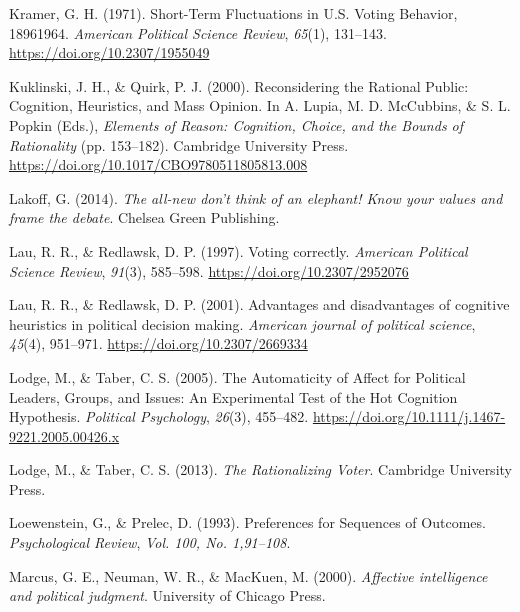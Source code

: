 \documentclass[
]{article}
\newlength{\cslhangindent}
\newlength{\cslentryspacingunit} %
\newenvironment{CSLReferences}[2] %
 {%
  \setlength{\parindent}{0pt}
  \ifodd #1
  \let\oldpar\par
  \def\par{\hangindent=\cslhangindent\oldpar}
  \fi
  \setlength{\parskip}{#2\cslentryspacingunit}
 }%
 {}
\begin{document}
\begin{CSLReferences}{1}{0}
\leavevmode{}%
Kramer, G. H. (1971). Short-{Term Fluctuations} in {U}.{S}. {Voting
Behavior}, 1896{\textendash}1964. \emph{American Political Science
Review}, \emph{65}(1), 131--143. \url{https://doi.org/10.2307/1955049}

\leavevmode{}%
Kuklinski, J. H., \& Quirk, P. J. (2000). Reconsidering the {Rational
Public}: {Cognition}, {Heuristics}, and {Mass Opinion}. In A. Lupia, M.
D. McCubbins, \& S. L. Popkin (Eds.), \emph{Elements of {Reason}:
{Cognition}, {Choice}, and the {Bounds} of {Rationality}} (pp.
153--182). {Cambridge University Press}.
\url{https://doi.org/10.1017/CBO9780511805813.008}

\leavevmode{}%
Lakoff, G. (2014). \emph{The all-new don't think of an elephant! Know
your values and frame the debate}. {Chelsea Green Publishing}.

\leavevmode{}%
Lau, R. R., \& Redlawsk, D. P. (1997). {Voting correctly}.
\emph{American Political Science Review}, \emph{91}(3), 585--598.
\url{https://doi.org/10.2307/2952076}

\leavevmode{}%
Lau, R. R., \& Redlawsk, D. P. (2001). {Advantages and disadvantages of
cognitive heuristics in political decision making}. \emph{American
journal of political science}, \emph{45}(4), 951--971.
\url{https://doi.org/10.2307/2669334}

\leavevmode{}%
Lodge, M., \& Taber, C. S. (2005). The {Automaticity} of {Affect} for
{Political Leaders}, {Groups}, and {Issues}: {An Experimental Test} of
the {Hot Cognition Hypothesis}. \emph{Political Psychology},
\emph{26}(3), 455--482.
\url{https://doi.org/10.1111/j.1467-9221.2005.00426.x}

\leavevmode{}%
Lodge, M., \& Taber, C. S. (2013). \emph{The {Rationalizing Voter}}.
{Cambridge University Press}.

\leavevmode{}%
Loewenstein, G., \& Prelec, D. (1993). Preferences for {Sequences} of
{Outcomes}. \emph{Psychological Review}, \emph{Vol. 100, No. 1,91--108}.

\leavevmode{}%
Marcus, G. E., Neuman, W. R., \& MacKuen, M. (2000). \emph{Affective
intelligence and political judgment}. {University of Chicago Press}.


\end{CSLReferences}
\end{document}
